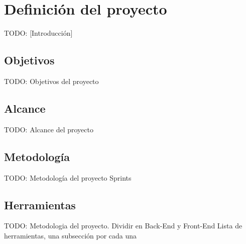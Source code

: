 \chapter{Definición del proyecto\label{cap:def_proyecto}}

TODO: [Introducción]


\section{Objetivos\label{sec:dp:objetivos}}

TODO: Objetivos del proyecto


\section{Alcance\label{sec:dp:alcance}}

TODO: Alcance del proyecto


\section{Metodología\label{sec:dp:metodologia}}

TODO: Metodología del proyecto {Sprints}


\section{Herramientas\label{sec:dp:herramientas}}

TODO: Metodologia del proyecto.
  {Dividir en Back-End y Front-End}
  {Lista de herramientas, una subsección por cada una}